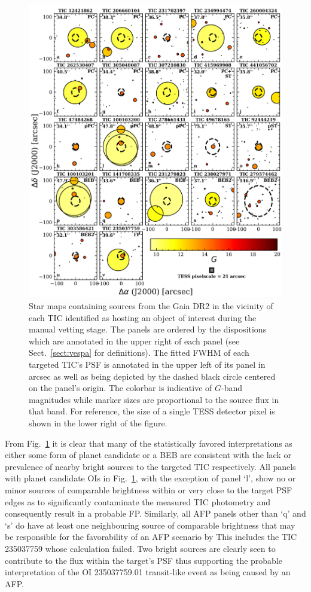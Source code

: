 \begin{figure}
  \centering
  \includegraphics[width=0.8\hsize]{figures/GaiaFPs.png}
  \caption[Gaia sources around TICs with \texttt{ORION} planet candidates.]
      {Star maps containing sources from the Gaia DR2 in the vicinity of each TIC identified
    as hosting an object of interest during the manual vetting stage. The panels are ordered by the
    dispositions which are annotated in the upper right of each panel (see Sect.~\ref{sect:vespa} for
    definitions). The fitted FWHM of each targeted TIC's PSF is annotated in the upper left
    of its panel in arcsec as well as being depicted by the dashed black circle centered on the
    panel's origin. The colorbar is indicative of $G$-band magnitudes while marker sizes are proportional
    to the source flux in that band. For reference, the size of a single TESS detector pixel is shown
    in the lower right of the figure.}
  \label{fig:gaiafps}
\end{figure}

From Fig.~\ref{fig:gaiafps} it is clear that many of the statistically favored interpretations as either 
some form of planet candidate or a BEB are consistent with the lack or prevalence of nearby bright sources
to the targeted TIC respectively.
All panels with planet candidate OIs in Fig.~\ref{fig:gaiafps}, with the exception of panel `l', show no
or minor sources of comparable brightness within or very close to the target PSF edges as to significantly
contaminate the measured TIC photometry and consequently result in a probable FP.
Similarly, all AFP panels other than `q'
and `s' do have at least one neighbouring source of comparable brightness that may be responsible
for the favorability of an AFP scenario by 
This includes the TIC 235037759 whose \vespa{} calculation failed.
Two bright sources are clearly seen to contribute to the flux within the target's PSF thus supporting the
probable interpretation of the OI 235037759.01 transit-like event as being caused by an AFP. \\

